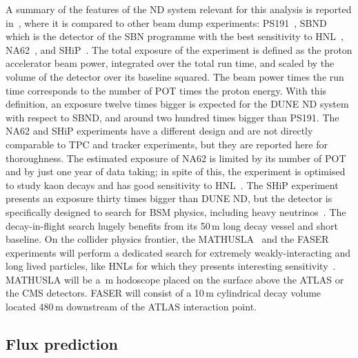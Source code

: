 A summary of the features of the ND system relevant for this analysis is reported in~, %
where it is compared to other beam dump experiments: %
PS191~\cite{Bernardi:1985ny,Bernardi:1987ek}, SBND which is the detector of the SBN programme with the best sensitivity to %
HNL~\cite{Ballett:2016opr}, NA62~\cite{NA62:2017rwk}, and SHiP~\cite{Anelli:2015pba}.
The total exposure of the experiment is defined as the proton accelerator beam power, integrated over the total run time, %
and scaled by the volume of the detector over its baseline squared.
The beam power times the run time corresponds to the number of POT times the proton energy. 
With this definition, an exposure twelve times bigger is expected for the DUNE ND system with respect to SBND, %
and around two hundred times bigger than PS191.
The NA62 and SHiP experiments have a different design and are not directly comparable to TPC and tracker experiments, %
but they are reported here for thoroughness.
The estimated exposure of NA62 is limited by its number of POT and by just one year of data taking; %
in spite of this, the experiment is optimised to study kaon decays and has good %
sensitivity to HNL~\cite{Drewes:2018irr}.
The SHiP experiment presents an exposure thirty times bigger than DUNE ND, but the detector is specifically %
designed to search for BSM physics, including heavy neutrinos~\cite{SHiP:2018xqw,Caputo:2016ojx}.
The decay-in-flight search hugely benefits from its 50\,m long decay vessel and short baseline.
On the collider physics frontier, the MATHUSLA~\cite{Curtin:2018mvb} and the FASER~\cite{Ariga:2018uku} experiments %
will perform a dedicated search for extremely weakly-interacting and long lived particles, %
like HNLs for which they presents interesting sensitivity~\cite{Curtin:2018mvb, Kling:2018wct}.
MATHUSLA will be a \,m hodoscope placed on the surface above the ATLAS or the CMS detectors.
FASER will consist of a 10\,m cylindrical decay volume located 480\,m downstream of the ATLAS interaction point. 

\subsection{Flux prediction}
\label{sec:tauneutrino}

